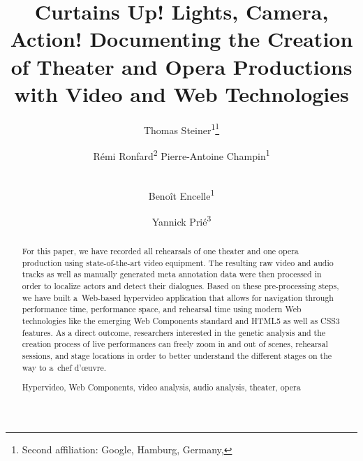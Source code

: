 \documentclass[runningheads,a4paper]{llncs}
\newcommand{\keywords}[1]{\par\addvspace\baselineskip
\noindent\keywordname\enspace\ignorespaces#1}
\begin{document}
\mainmatter  %

\title{Curtains Up! Lights, Camera, Action! Documenting the Creation of Theater and Opera Productions with Video and Web Technologies}


\author{
  Thomas Steiner\textsuperscript{1}\thanks{Second affiliation: Google, Hamburg, Germany, } \and
  Rémi Ronfard\textsuperscript{2}
  Pierre-Antoine Champin\textsuperscript{1} \and \\
  Benoît Encelle\textsuperscript{1}\and
  Yannick Prié\textsuperscript{3}
}
%


\maketitle

\begin{abstract}
For this paper, we have recorded all rehearsals of one theater and one opera production
using state-of-the-art video equipment.
The resulting raw video and audio tracks as well as manually generated meta annotation data
were then processed in order to localize actors and detect their dialogues.
Based on these pre-processing steps, we have built a~Web-based hypervideo application
that allows for navigation through performance time, performance space, and rehearsal time
using modern Web technologies like the emerging Web Components standard and HTML5
as well as CSS3 features.
As a direct outcome, researchers interested in the genetic analysis
and the creation process of live performances can freely zoom in and out of scenes,
rehearsal sessions, and stage locations in order to better understand
the different stages on the way to a~chef d'œuvre.

\keywords{Hypervideo, Web Components, video analysis, audio analysis, theater, opera}
\end{abstract}
\end{document}

